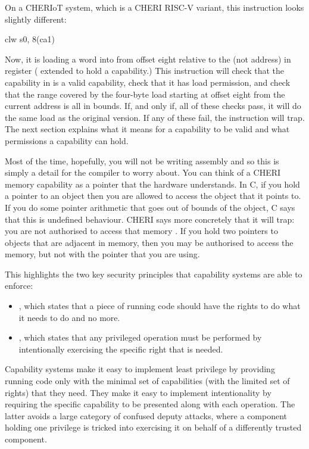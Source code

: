 On a CHERIoT system, which is a CHERI RISC-V variant, this instruction looks slightly different:

\begin{asmsnippet}
	clw	s0, 8(ca1)
\end{asmsnippet}

Now, it is loading a word into  from offset eight relative to the  (not address) in register  ( extended to hold a capability.)
This instruction will check that the capability in  is a valid capability, check that it has load permission, and check that the range covered by the four-byte load starting at offset eight from the current address is all in bounds.
If, and only if, all of these checks pass, it will do the same load as the original version.
If any of these fail, the instruction will trap.
The next section explains what it means for a capability to be valid and what permissions a capability can hold.

Most of the time, hopefully, you will not be writing assembly and so this is simply a detail for the compiler to worry about.
You can think of a CHERI memory capability as a pointer that the hardware understands.
In C, if you hold a pointer to an object then you are allowed to access the object that it points to.
If you do some pointer arithmetic that goes out of bounds of the object, C says that this is undefined behaviour.
CHERI says more concretely that it will trap: you are not authorised to access that memory .
If you hold two pointers to objects that are adjacent in memory, then you may be authorised to access the memory, but not with the pointer that you are using.

This highlights the two key security principles that capability systems are able to enforce:

\begin{itemize}
	\item{, which states that a piece of running code should have the rights to do what it needs to do and no more.}
	\item{, which states that any privileged operation must be performed by intentionally exercising the specific right that is needed.}
\end{itemize}

Capability systems make it easy to implement least privilege by providing running code only with the minimal set of capabilities (with the limited set of rights) that they need.
They make it easy to implement intentionality by requiring the specific capability to be presented along with each operation.
The latter avoids a large category of confused deputy attacks, where a component holding one privilege is tricked into exercising it on behalf of a differently trusted component.

